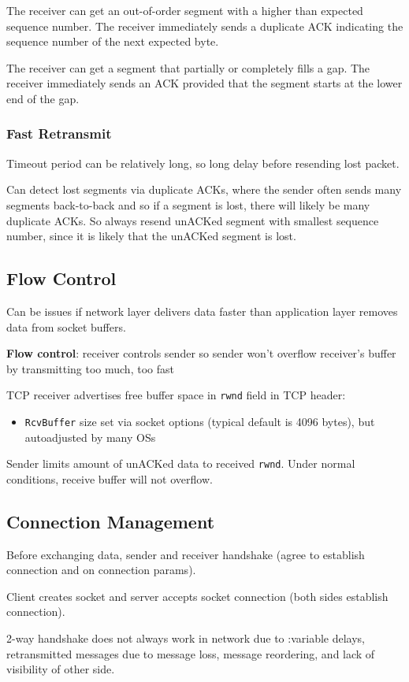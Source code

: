 \documentclass[11pt]{article}
\begin{document}
The receiver can get an out-of-order segment with a higher than expected sequence number.
The receiver immediately sends a duplicate ACK indicating the sequence number of the next
expected byte.

The receiver can get a segment that partially or completely fills a gap.
The receiver immediately sends an ACK provided that the segment starts at the lower end
of the gap.
\subsubsection{Fast Retransmit}
\label{sec:org3e1bb3b}
Timeout period can be relatively long, so long delay before resending lost packet.

Can detect lost segments via duplicate ACKs, where the sender often sends many segments
back-to-back and so if a segment is lost, there will likely be many duplicate ACKs.
So always resend unACKed segment with smallest sequence number, since it is likely that
the unACKed segment is lost.
\subsection{Flow Control}
\label{sec:org312c98c}
Can be issues if network layer delivers data faster than application layer removes data
from socket buffers.

\textbf{Flow control}: receiver controls sender so sender won't overflow receiver's buffer by transmitting
too much, too fast

TCP receiver advertises free buffer space in \texttt{rwnd} field in TCP header:
\begin{itemize}
\item \texttt{RcvBuffer} size set via socket options (typical default is 4096 bytes), but autoadjusted
by many OSs
\end{itemize}

Sender limits amount of unACKed data to received \texttt{rwnd}.
Under normal conditions, receive buffer will not overflow.
\subsection{Connection Management}
\label{sec:org059e12d}
Before exchanging data, sender and receiver handshake (agree to establish connection and on
connection params).

Client creates socket and server accepts socket connection (both sides establish connection).

2-way handshake does not always work in network due to :variable delays, retransmitted
messages due to message loss, message reordering, and lack of visibility of other side.
\end{document}
